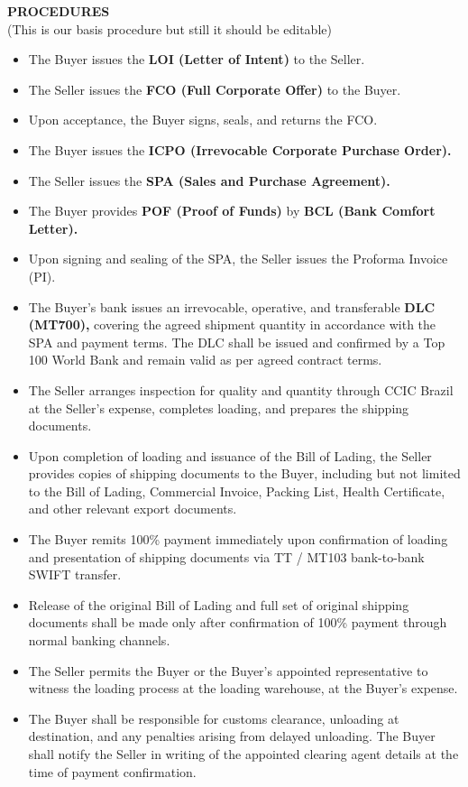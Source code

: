 \documentclass[a4paper,11pt]{article}
\begin{document}
\vspace{0.3cm}
\begin{center}
  {\large\textbf{\color{marooncolor}PROCEDURES}}\\[4pt]
  {\small\color{marooncolor}(This is our basis procedure but still it should be editable)}
\end{center}
\vspace{0.1cm}
\begin{itemize}[leftmargin=1.5em, itemsep=3pt, topsep=2pt]
\item The Buyer issues the \textbf{LOI (Letter of Intent)} to the Seller.
\item The Seller issues the \textbf{FCO (Full Corporate Offer)} to the Buyer.
\item Upon acceptance, the Buyer signs, seals, and returns the FCO.
\item The Buyer issues the \textbf{ICPO (Irrevocable Corporate Purchase Order).}
\item The Seller issues the \textbf{SPA (Sales and Purchase Agreement).}
\item The Buyer provides \textbf{POF (Proof of Funds)} by \textbf{BCL (Bank Comfort Letter).}
\item Upon signing and sealing of the SPA, the Seller issues the Proforma Invoice (PI).
\item The Buyer's bank issues an irrevocable, operative, and transferable \textbf{DLC (MT700),} covering the agreed shipment quantity in accordance with the SPA and payment terms. The DLC shall be issued and confirmed by a Top 100 World Bank and remain valid as per agreed contract terms.
\item The Seller arranges inspection for quality and quantity through CCIC Brazil at the Seller's expense, completes loading, and prepares the shipping documents.
\item Upon completion of loading and issuance of the Bill of Lading, the Seller provides copies of shipping documents to the Buyer, including but not limited to the Bill of Lading, Commercial Invoice, Packing List, Health Certificate, and other relevant export documents.
\item The Buyer remits 100\% payment immediately upon confirmation of loading and presentation of shipping documents via TT / MT103 bank-to-bank SWIFT transfer.
\item Release of the original Bill of Lading and full set of original shipping documents shall be made only after confirmation of 100\% payment through normal banking channels.
\item The Seller permits the Buyer or the Buyer's appointed representative to witness the loading process at the loading warehouse, at the Buyer's expense.
\item The Buyer shall be responsible for customs clearance, unloading at destination, and any penalties arising from delayed unloading. The Buyer shall notify the Seller in writing of the appointed clearing agent details at the time of payment confirmation.
\end{itemize}
\end{document}
